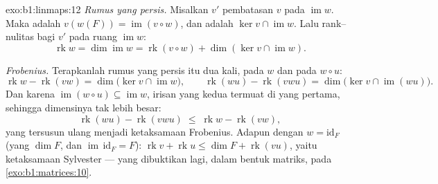 \begin{solution}{exo:b1:linmaps:12}
\emph{Rumus yang persis.} Misalkan $v'$ pembatasan $v$ pada
 $\operatorname{im} w$. Maka  adalah $v(w(F)) =
\operatorname{im}(v \circ w)$, dan  adalah $\ker v \cap
\operatorname{im} w$. Lalu rank--nulitas bagi $v'$ pada ruang
$\operatorname{im} w$:
\[
\operatorname{rk} w = \dim\operatorname{im} w
= \operatorname{rk}(v \circ w) + \dim(\ker v \cap
\operatorname{im} w) .
\]

\emph{Frobenius.} Terapkanlah rumus yang persis itu dua kali, pada $w$ dan pada
$w \circ u$:
\[
\operatorname{rk} w - \operatorname{rk}(vw)
= \dim\bigl(\ker v \cap \operatorname{im} w\bigr),
\qquad
\operatorname{rk}(wu) - \operatorname{rk}(vwu)
= \dim\bigl(\ker v \cap \operatorname{im}(wu)\bigr) .
\]
Dan karena $\operatorname{im}(w \circ u) \subseteq \operatorname{im}
w$, irisan yang kedua termuat di yang pertama, sehingga
dimensinya tak lebih besar:
\[
\operatorname{rk}(wu) - \operatorname{rk}(vwu)
\;\leq\; \operatorname{rk} w - \operatorname{rk}(vw) ,
\]
yang tersusun ulang menjadi ketaksamaan Frobenius. Adapun dengan $w =
\mathrm{id}_F$ (yang  $\dim F$, dan $\operatorname{im}\,
\mathrm{id}_F = F$): $\operatorname{rk} v + \operatorname{rk} u
\leq \dim F + \operatorname{rk}(vu)$, yaitu ketaksamaan Sylvester ---
yang dibuktikan lagi, dalam bentuk matriks, pada \cref{exo:b1:matrices:10}.
\end{solution}

